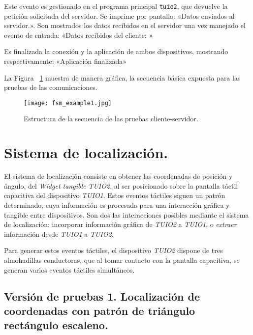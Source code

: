 Este evento es gestionado en el programa principal \texttt{tuio2}, que devuelve la petición solicitada del servidor. Se imprime por pantalla: «Datos enviados al servidor.». Son mostrados los datos recibidos en el servidor una vez manejado el evento de entrada: «Datos recibidos del cliente: » 

Es finalizada la conexión y la aplicación de ambos dispositivos, mostrando respectivamente: «Aplicación finalizada»

La Figura ~\ref{fig:fsmexample} muestra de manera gráfica, la secuencia básica expuesta para las pruebas de las comunicaciones.

\begin{figure}[!h]
\begin{center}
\texttt{[image: fsm\_example1.jpg]}
\caption{Estructura de la secuencia de las pruebas cliente-servidor.}
\label{fig:fsmexample}
\end{center}
\end{figure}


\section{Sistema de localización.}
El sistema de localización consiste en obtener las coordenadas de posición y ángulo, del \emph{Widget tangible TUIO2}, al ser posicionado sobre la pantalla táctil capacitiva del dispositivo \emph{TUIO1}. Estos eventos táctiles siguen un patrón determinado, cuya información es procesada para una interacción gráfica y tangible entre dispositivos.
Son dos las interacciones posibles mediante el sistema de localización: incorporar información gráfica de \emph{TUIO2} a \emph{TUIO1}, o \emph{extraer} información desde \emph{TUIO1} a \emph{TUIO2}.

Para generar estos eventos táctiles, el dispositivo \emph{TUIO2} dispone de tres almohadillas conductoras, que al tomar contacto con la pantalla capacitiva, se generan varios eventos táctiles simultáneos.

\subsection{Versión de pruebas 1. Localización de coordenadas con patrón de triángulo rectángulo escaleno.}  

